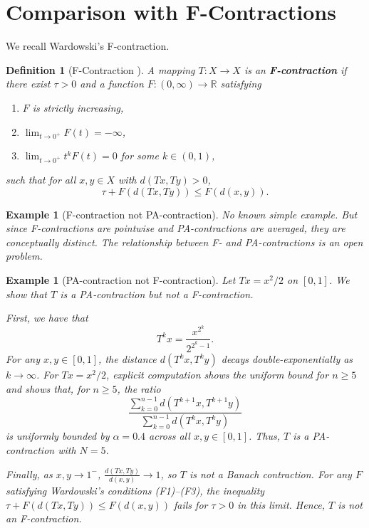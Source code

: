 \documentclass[11pt]{article}
\newtheorem{definition}[theorem]{Definition}
\newtheorem{example}[theorem]{Example}
\begin{document}
\section{Comparison with F-Contractions}

We recall Wardowski's F-contraction.

\begin{definition}[F-Contraction \cite{Wardowski2012}]
A mapping $ T: X \to X $ is an \textbf{F-contraction} if there exist $ \tau > 0 $ and a function $ F: (0,\infty) \to \mathbb{R} $ satisfying
\begin{enumerate}
\item[(F1)] $ F $ is strictly increasing,
\item[(F2)] $ \lim_{t \to 0^+} F(t) = -\infty $,
\item[(F3)] $ \lim_{t \to 0^+} t^k F(t) = 0 $ for some $ k \in (0,1) $,
\end{enumerate}
such that for all $ x,y \in X $ with $ d(Tx,Ty) > 0 $,
\begin{equation}
\tau + F(d(Tx, Ty)) \leq F(d(x,y)).
\end{equation}
\end{definition}



\begin{example}[F-contraction not PA-contraction]

No known simple example. But since F-contractions are pointwise and PA-contractions are averaged, they are conceptually distinct.
The relationship between F- and PA-contractions is an open problem.
\end{example}



\begin{example}[PA-contraction not F-contraction]
Let $ T x = x^2/2 $ on $ [0,1] $. We show that $ T $ is a PA-contraction but not a  F-contraction.

First, we have that
\begin{equation}
T^k x = \frac{x^{2^k}}{2^{2^k - 1}}.
\label{t2}
\end{equation}
For any $ x, y \in [0,1] $, the distance $ d(T^k x, T^k y) $ decays double-exponentially as $ k \to \infty $. 
For $Tx = x^2/2$, explicit computation shows
the uniform bound for $n \ge 5$ and shows that, for $ n \geq 5 $, the ratio
\begin{equation}
\frac{ \sum_{k=0}^{n-1} d(T^{k+1}x, T^{k+1}y) }{ \sum_{k=0}^{n-1} d(T^k x, T^k y) }
\end{equation}
is uniformly bounded by $ \alpha = 0.4 $ across all $ x, y \in [0,1] $. Thus, $ T $ is a PA-contraction with $ N = 5 $.


Finally, as $ x,y \to 1^- $, $ \frac{d(Tx,Ty)}{d(x,y)} \to 1 $, so $ T $ is not a Banach contraction. For any $ F $ satisfying Wardowski's conditions (F1)--(F3), the inequality $ \tau + F(d(Tx,Ty)) \leq F(d(x,y)) $ fails for $ \tau > 0 $ in this limit. Hence, $ T $ is not an F-contraction.
\end{example}
\end{document}
